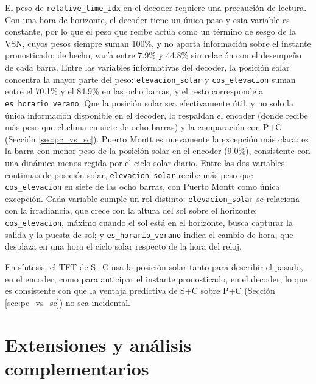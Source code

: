 El peso de \texttt{relative\_time\_idx} en el decoder requiere una precaución de lectura. Con una hora de horizonte, el decoder tiene un único paso y esta variable es constante, por lo que el peso que recibe actúa como un término de sesgo de la VSN, cuyos pesos siempre suman 100\%, y no aporta información sobre el instante pronosticado; de hecho, varía entre 7.9\% y 44.8\% sin relación con el desempeño de cada barra. Entre las variables informativas del decoder, la posición solar concentra la mayor parte del peso: \texttt{elevacion\_solar} y \texttt{cos\_elevacion} suman entre el 70.1\% y el 84.9\% en las ocho barras, y el resto corresponde a \texttt{es\_horario\_verano}. Que la posición solar sea efectivamente útil, y no solo la única información disponible en el decoder, lo respaldan el encoder (donde recibe más peso que el clima en siete de ocho barras) y la comparación con P+C (Sección \ref{sec:pc_vs_sc}). Puerto Montt es nuevamente la excepción más clara: es la barra con menor peso de la posición solar en el encoder (9.0\%), consistente con una dinámica menos regida por el ciclo solar diario. Entre las dos variables continuas de posición solar, \texttt{elevacion\_solar} recibe más peso que \texttt{cos\_elevacion} en siete de las ocho barras, con Puerto Montt como única excepción. Cada variable cumple un rol distinto: \texttt{elevacion\_solar} se relaciona con la irradiancia, que crece con la altura del sol sobre el horizonte; \texttt{cos\_elevacion}, máximo cuando el sol está en el horizonte, busca capturar la salida y la puesta de sol; y \texttt{es\_horario\_verano} indica el cambio de hora, que desplaza en una hora el ciclo solar respecto de la hora del reloj.

En síntesis, el TFT de S+C usa la posición solar tanto para describir el pasado, en el encoder, como para anticipar el instante pronosticado, en el decoder, lo que es consistente con que la ventaja predictiva de S+C sobre P+C (Sección \ref{sec:pc_vs_sc}) no sea incidental.

\section{Extensiones y análisis complementarios}

